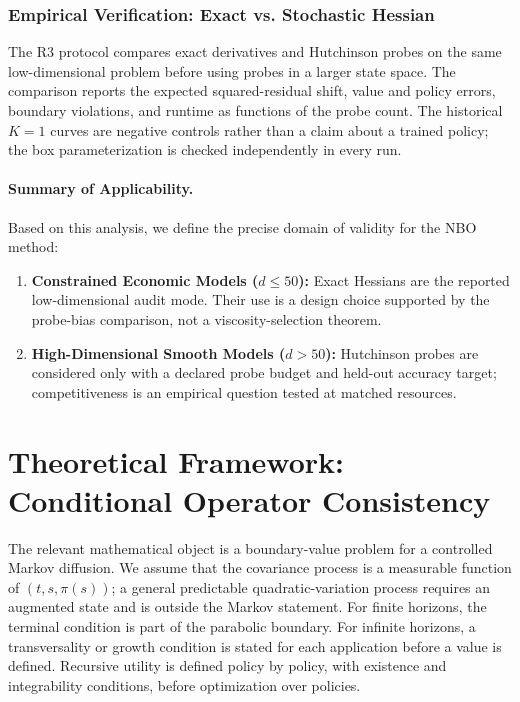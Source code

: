 \documentclass[ecta]{econsocart}
\theoremstyle{plain}
\theoremstyle{remark}
\begin{document}
\subsubsection{Empirical Verification: Exact vs. Stochastic Hessian}
The R3 protocol compares exact derivatives and Hutchinson probes on the same low-dimensional problem before using probes in a larger state space. The comparison reports the expected squared-residual shift, value and policy errors, boundary violations, and runtime as functions of the probe count. The historical $K=1$ curves are negative controls rather than a claim about a trained policy; the box parameterization is checked independently in every run.

\paragraph*{Summary of Applicability.}
Based on this analysis, we define the precise domain of validity for the NBO method:
\begin{enumerate}
    \item \textbf{Constrained Economic Models ($d \le 50$):} Exact Hessians are the reported low-dimensional audit mode. Their use is a design choice supported by the probe-bias comparison, not a viscosity-selection theorem.
    \item \textbf{High-Dimensional Smooth Models ($d > 50$):} Hutchinson probes are considered only with a declared probe budget and held-out accuracy target; competitiveness is an empirical question tested at matched resources.
\end{enumerate}


\section{Theoretical Framework: Conditional Operator Consistency}
\label{sec:theoretical_framework}
The relevant mathematical object is a boundary-value problem for a controlled Markov diffusion. We assume that the covariance process is a measurable function of $(t,s,\pi(s))$; a general predictable quadratic-variation process requires an augmented state and is outside the Markov statement. For finite horizons, the terminal condition is part of the parabolic boundary. For infinite horizons, a transversality or growth condition is stated for each application before a value is defined. Recursive utility is defined policy by policy, with existence and integrability conditions, before optimization over policies.
\end{document}
